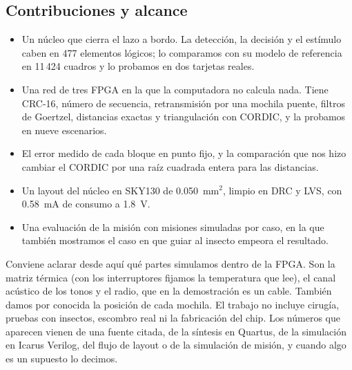 \subsection{Contribuciones y alcance}

\begin{itemize}
    \item Un núcleo que cierra el lazo a bordo. La detección, la decisión y el estímulo caben en 477 elementos lógicos; lo
        comparamos con su modelo de referencia en 11\,424 cuadros y lo probamos en dos tarjetas reales.
  \item Una red de tres FPGA en la que la computadora no calcula nada. Tiene CRC-16, número de secuencia, retransmisión por
        una mochila puente, filtros de Goertzel, distancias exactas y triangulación con CORDIC, y la probamos en nueve
        escenarios.
  \item El error medido de cada bloque en punto fijo, y la comparación que nos hizo cambiar el CORDIC por una raíz cuadrada
        entera para las distancias.
  \item Un layout del núcleo en SKY130 de 0.050~mm$^2$, limpio en DRC y LVS, con 0.58~mA de consumo a 1.8~V.
  \item Una evaluación de la misión con \numMisiones{} misiones simuladas por caso, en la que también mostramos el caso en
        que guiar al insecto empeora el resultado.
\end{itemize}

Conviene aclarar desde aquí qué partes simulamos dentro de la FPGA. Son la matriz térmica (con los interruptores fijamos la
temperatura que lee), el canal acústico de los tonos y el radio, que en la demostración es un cable. También damos por
conocida la posición de cada mochila. El trabajo no incluye cirugía, pruebas con insectos, escombro real ni la fabricación
del chip. Los números que aparecen vienen de una fuente citada, de la síntesis en Quartus, de la simulación en Icarus
Verilog, del flujo de layout o de la simulación de misión, y cuando algo es un supuesto lo decimos.
